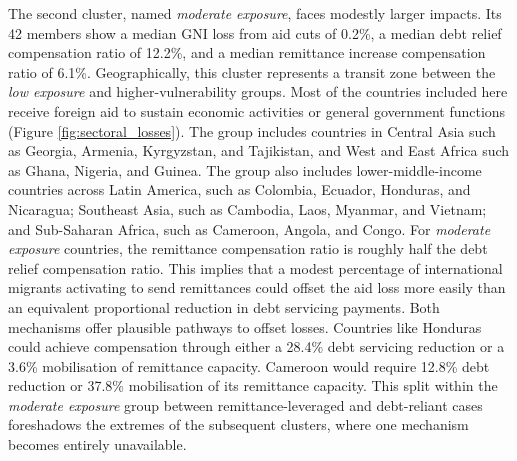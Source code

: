\documentclass[fleqn,10pt,twocolumn]{wlscirep}
\begin{document}
{%
{
The second cluster, named \textit{moderate exposure}, faces modestly larger impacts. Its 42 members show a median GNI loss from aid cuts of 0.2\%, a median debt relief compensation ratio of 12.2\%, and a median remittance increase compensation ratio of 6.1\%. Geographically, this cluster represents a transit zone between the \textit{low exposure} and higher-vulnerability groups. Most of the countries included here receive foreign aid to sustain economic activities or general government functions (Figure \ref{fig:sectoral_losses}). The group includes countries in Central Asia such as Georgia, Armenia, Kyrgyzstan, and Tajikistan, and West and East Africa such as Ghana, Nigeria, and Guinea. The group also includes lower-middle-income countries across Latin America, such as Colombia, Ecuador, Honduras, and Nicaragua; Southeast Asia, such as Cambodia, Laos, Myanmar, and Vietnam; and Sub-Saharan Africa, such as Cameroon, Angola, and Congo. For \textit{moderate exposure} countries, the remittance compensation ratio is roughly half the debt relief compensation ratio. This implies that a modest percentage of international migrants activating to send remittances could offset the aid loss more easily than an equivalent proportional reduction in debt servicing payments. Both mechanisms offer plausible pathways to offset losses. Countries like Honduras could achieve compensation through either a 28.4\% debt servicing reduction or a 3.6\% mobilisation of remittance capacity. Cameroon would require 12.8\% debt reduction or 37.8\% mobilisation of its remittance capacity. This split within the \textit{moderate exposure} group between remittance-leveraged and debt-reliant cases foreshadows the extremes of the subsequent clusters, where one mechanism becomes entirely unavailable. 
}

}
\end{document}
